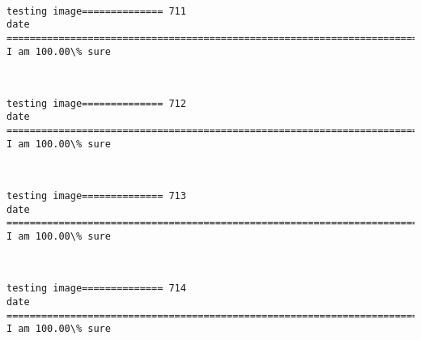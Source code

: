 \documentclass[11pt]{article}
\begin{document}
    \begin{center}
    \end{center}
    { \hspace*{\fill} \\}
    
    \begin{Verbatim}[commandchars=\\\{\}]
testing image============== 711
date
============================================================================
I am 100.00\% sure

    \end{Verbatim}

    \begin{center}
    \end{center}
    { \hspace*{\fill} \\}
    
    \begin{Verbatim}[commandchars=\\\{\}]
testing image============== 712
date
============================================================================
I am 100.00\% sure

    \end{Verbatim}

    \begin{center}
    \end{center}
    { \hspace*{\fill} \\}
    
    \begin{Verbatim}[commandchars=\\\{\}]
testing image============== 713
date
============================================================================
I am 100.00\% sure

    \end{Verbatim}

    \begin{center}
    \end{center}
    { \hspace*{\fill} \\}
    
    \begin{Verbatim}[commandchars=\\\{\}]
testing image============== 714
date
============================================================================
I am 100.00\% sure

    \end{Verbatim}
\end{document}
